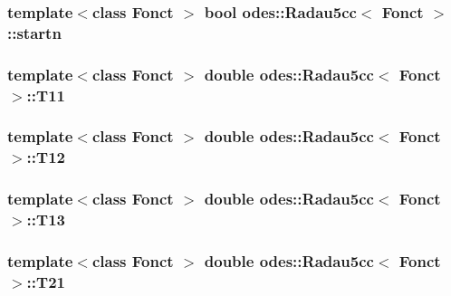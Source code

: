 \subsubsection[{startn}]{\setlength{\rightskip}{0pt plus 5cm}template$<$class Fonct $>$ bool {\bf odes\+::\+Radau5cc}$<$ Fonct $>$\+::startn\hspace{0.3cm}{\ttfamily [private]}}\label{classodes_1_1Radau5cc_a04284948029a635e8d0d4ea79e15c5ea}
\hypertarget{classodes_1_1Radau5cc_a3538e815c4a1a4449692ef7cf5331fcc}{}
\subsubsection[{T11}]{\setlength{\rightskip}{0pt plus 5cm}template$<$class Fonct $>$ double {\bf odes\+::\+Radau5cc}$<$ Fonct $>$\+::T11\hspace{0.3cm}{\ttfamily [private]}}\label{classodes_1_1Radau5cc_a3538e815c4a1a4449692ef7cf5331fcc}
\hypertarget{classodes_1_1Radau5cc_ac47257f4b685d8016d8bdc0aaf6c3861}{}
\subsubsection[{T12}]{\setlength{\rightskip}{0pt plus 5cm}template$<$class Fonct $>$ double {\bf odes\+::\+Radau5cc}$<$ Fonct $>$\+::T12\hspace{0.3cm}{\ttfamily [private]}}\label{classodes_1_1Radau5cc_ac47257f4b685d8016d8bdc0aaf6c3861}
\hypertarget{classodes_1_1Radau5cc_a49b429abb614b8d4f41e6df611a12c06}{}
\subsubsection[{T13}]{\setlength{\rightskip}{0pt plus 5cm}template$<$class Fonct $>$ double {\bf odes\+::\+Radau5cc}$<$ Fonct $>$\+::T13\hspace{0.3cm}{\ttfamily [private]}}\label{classodes_1_1Radau5cc_a49b429abb614b8d4f41e6df611a12c06}
\hypertarget{classodes_1_1Radau5cc_a5933359813b622b1dd1f67605df31521}{}
\subsubsection[{T21}]{\setlength{\rightskip}{0pt plus 5cm}template$<$class Fonct $>$ double {\bf odes\+::\+Radau5cc}$<$ Fonct $>$\+::T21\hspace{0.3cm}{\ttfamily [private]}}\label{classodes_1_1Radau5cc_a5933359813b622b1dd1f67605df31521}
\hypertarget{classodes_1_1Radau5cc_a1c4adb6f7b47032fe75bd53884a37ef3}{}

